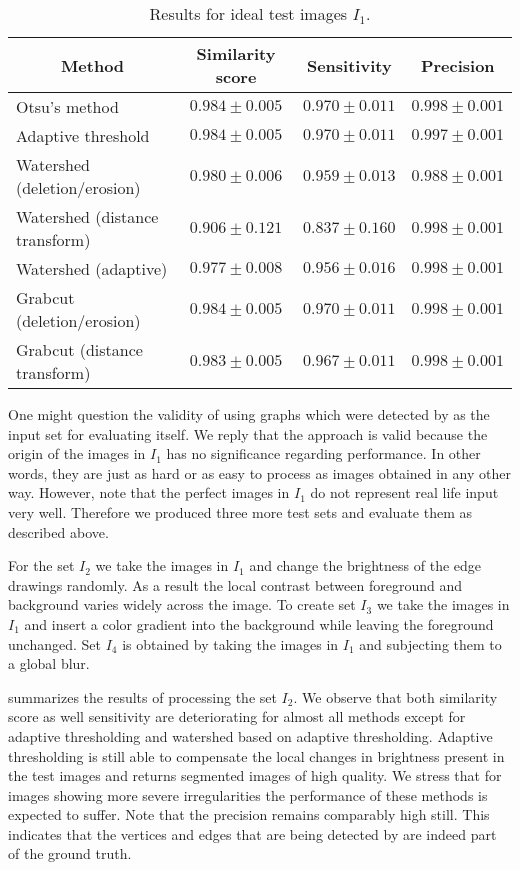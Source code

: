 		\begin{table}
			\centering
			\begin{tabular}{@{} l *3c @{}}
			\toprule
			\multicolumn{1}{c}{Method}    & Similarity score  & Sensitivity  & Precision \\ 
			\midrule
			Otsu's method                   & $0.984 \pm 0.005$ & $0.970 \pm 0.011$ & $0.998 \pm 0.001$ \\
			Adaptive threshold              & $0.984 \pm 0.005$ & $0.970 \pm 0.011$ & $0.997 \pm 0.001$ \\
			Watershed (deletion/erosion)    & $0.980 \pm 0.006$ & $0.959 \pm 0.013$ & $0.988 \pm 0.001$ \\
			Watershed (distance transform)  & $0.906 \pm 0.121$ & $0.837 \pm 0.160$ & $0.998 \pm 0.001$ \\
			Watershed (adaptive)            & $0.977 \pm 0.008$ & $0.956 \pm 0.016$ & $0.998 \pm 0.001$ \\
			Grabcut (deletion/erosion)      & $0.984 \pm 0.005$ & $0.970 \pm 0.011$ & $0.998 \pm 0.001$ \\
			Grabcut (distance transform)    & $0.983 \pm 0.005$ & $0.967 \pm 0.011$ & $0.998 \pm 0.001$ \\
			\bottomrule
			\end{tabular}
			\caption[\NEFIs evaluation - Ideal images]{Results for ideal test images $I_1$.}
			\label{tab:optimal}
		\end{table}

		One might question the validity of using graphs which were detected by \NEFI as the input set for evaluating \NEFI itself. We reply that the approach is valid because the origin of the images in $I_1$ has no significance regarding \NEFIs performance. In other words, they are just as hard or as easy to process as images obtained in any other way. However, note that the perfect images in $I_1$ do not represent real life input very well. Therefore we produced three more test sets and evaluate them as described above.

		For the set $I_2$ we take the images in $I_1$ and change the brightness of the edge drawings randomly. As a result the local contrast between foreground and background varies widely across the image. To create set $I_3$ we take the images in $I_1$ and insert a color gradient into the background while leaving the foreground unchanged. Set $I_4$ is obtained by taking the images in $I_1$ and subjecting them to a global blur.

		 summarizes the results of processing the set $I_2$. We observe that both similarity score as well sensitivity are deteriorating for almost all methods except for adaptive thresholding and watershed based on adaptive thresholding. Adaptive thresholding is still able to compensate the local changes in brightness present in the test images and returns segmented images of high quality. We stress that for images showing more severe irregularities the performance of these methods is expected to suffer. Note that the precision remains comparably high still. This indicates that the vertices and edges that are being detected by \NEFI are indeed part of the ground truth.


